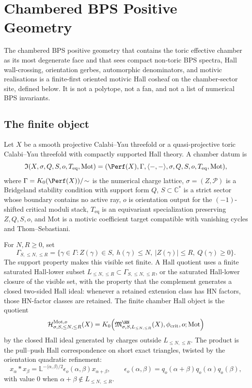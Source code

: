 \chapter{Chambered BPS Positive Geometry}
\label{chap:bps-positive-geometry-closure}
\providecommand{\Mot}{\mathrm{Mot}}
\providecommand{\Int}{\mathrm{Int}}
\providecommand{\Real}{\mathrm{Real}}
\providecommand{\Dec}{\mathrm{Dec}}
\providecommand{\Enh}{\mathrm{Enh}}
\providecommand{\KS}{\mathrm{KS}}
\providecommand{\Sol}{\mathrm{Sol}}
\providecommand{\ObsMap}{\mathrm{Obs}}

\noindent
The chambered BPS positive geometry that contains the toric effective
chamber as its most degenerate face and that sees compact non-toric BPS
spectra, Hall wall-crossing, orientation gerbes, automorphic
denominators, and motivic realisations is a finite-first oriented
motivic Hall cosheaf on the chamber-sector site, defined below. It is
not a polytope, not a fan, and not a list of numerical BPS invariants.

\section{The finite object}

Let \(X\) be a smooth projective Calabi--Yau threefold or a
quasi-projective toric Calabi--Yau threefold with compactly supported
Hall theory. A chamber datum is
\[
{\mathfrak I}(X,\sigma,Q,S,o,T_{\mathrm{eq}},\Mot)
 =
(\Perf(X),\Gamma,\langle-,-\rangle,\sigma,Q,S,o,T_{\mathrm{eq}},\Mot),
\]
where \(\Gamma=K_0(\Perf(X))/\!\sim\) is the numerical charge lattice,
\(\sigma=(Z,\mathcal P)\) is a Bridgeland stability condition with
support form \(Q\), \(S\subset\mathbb C^*\) is a strict sector whose
boundary contains no active ray, \(o\) is orientation output for the
\((-1)\)-shifted critical moduli stack, \(T_{\mathrm{eq}}\) is an
equivariant specialization preserving \(Z,Q,S,o\), and \(\Mot\) is a
motivic coefficient target compatible with vanishing cycles and
Thom--Sebastiani.

For \(N,R\geq 0\), set
\[
\Gamma_{S,\leq N,\leq R}
=
\{\gamma\in\Gamma:
 Z(\gamma)\in S,\ h(\gamma)\leq N,\ |Z(\gamma)|\leq R,\ Q(\gamma)\geq0\}.
\]
The support property makes this visible set finite. A Hall quotient
uses a finite saturated Hall-lower subset
\(L_{\leq N,\leq R}\subset \Gamma_{S,\leq N,\leq R}\), or the saturated
Hall-lower closure of the visible set, with the property that the
complement generates a closed two-sided Hall ideal: whenever a retained
extension class has HN factors, those HN-factor classes are retained.
The finite chamber Hall object is the quotient
\[
\mathcal H^{\Mot,o}_{\sigma,S,\leq N,\leq R}(X)
=
K_0\!\left(
\mathfrak M^{\HN}_{\sigma,S,L_{\leq N,\leq R}}(X),
\phi_{\mathrm{crit}},o;\Mot
\right)
\]
by the closed Hall ideal generated by charges outside
\(L_{\leq N,\leq R}\). The product is the pull--push Hall
correspondence on short exact triangles, twisted by the orientation
quadratic refinement:
\[
x_\alpha*x_\beta
=
\mathbb L^{-\langle\alpha,\beta\rangle/2}
\epsilon_o(\alpha,\beta)x_{\alpha+\beta},
\qquad
\epsilon_o(\alpha,\beta)
=q_o(\alpha+\beta)q_o(\alpha)q_o(\beta),
\]
with value \(0\) when \(\alpha+\beta\notin L_{\leq N,\leq R}\).

